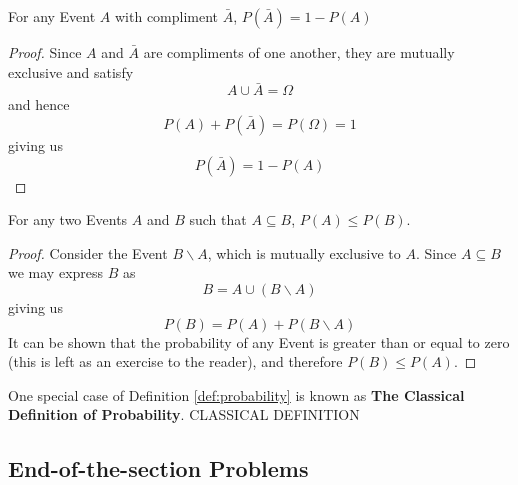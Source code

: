 \documentclass{report}
\begin{document}
\begin{lemma}
    For any Event $A$ with compliment $\bar A$, $P(\bar A)=1-P(A)$
\begin{proof}
    Since $A$ and $\bar A$ are compliments of one another, they are mutually exclusive and satisfy
    \[
        A\cup \bar A = \Omega
    \]
    and hence
    \[
        P(A)+P(\bar A) = P(\Omega) = 1
    \]
    giving us
    \[
        P(\bar A)=1-P(A)
    \]
\end{proof}
\end{lemma}

\begin{lemma}
    For any two Events $A$ and $B$ such that $A\subseteq B$, $P(A)\le P(B)$.
    
    \begin{proof}
    Consider the Event $B\backslash A$, which is mutually exclusive to $A$. Since $A\subseteq B$ we may express $B$ as
    \[
        B=A\cup (B\backslash A)
    \]
    giving us
    \[
        P(B)=P(A)+P(B\backslash A)
    \]
    It can be shown that the probability of any Event is greater than or equal to zero (this is left as an exercise to the reader), and therefore $P(B)\le P(A)$.
    \end{proof}
\end{lemma}

One special case of Definition \ref{def:probability} is known as \textbf{The Classical Definition of Probability}. \todo CLASSICAL DEFINITION

\subsection{End-of-the-section Problems}\label{sec:problaw_eosp}
\end{document}
